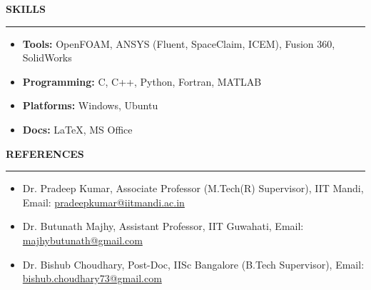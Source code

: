\documentclass[letterpaper,10pt]{article}
\newcommand{\sectionline}[1]{%
    \vspace{0.7em}%
    \textbf{\large #1} \vspace{-2.0em}\\%
    
    \rule{\textwidth}{0.5pt}%
    \vspace{0.25em}%
}
\begin{document}
\sectionline{SKILLS }
\begin{itemize}[leftmargin=*]
  \item \textbf{Tools:} OpenFOAM, ANSYS (Fluent, SpaceClaim, ICEM), Fusion 360, SolidWorks
  \item \textbf{Programming:} C, C++, Python, Fortran, MATLAB
  \item \textbf{Platforms:} Windows, Ubuntu 
  \item \textbf{Docs:} LaTeX, MS Office
\end{itemize}


\sectionline{REFERENCES}
\begin{itemize}
    \item Dr. Pradeep Kumar, Associate Professor (M.Tech(R) Supervisor), IIT Mandi, Email: \href{pradeepkumar@iitmandi.ac.in}{pradeepkumar@iitmandi.ac.in}
    \item Dr. Butunath Majhy, Assistant Professor, IIT Guwahati, Email: \href{majhybutunath@gmail.com}{majhybutunath@gmail.com}
    \item Dr. Bishub Choudhary, Post-Doc, IISc Bangalore (B.Tech Supervisor), Email: \href{bishub.choudhary73@gmail.com}{bishub.choudhary73@gmail.com}
\end{itemize}
\end{document}
